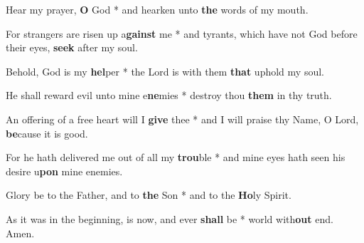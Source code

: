 \begin{multicols}{2}
	Hear my prayer, \textbf{O} God * and hearken unto \textbf{the} words of my mouth.
	
	For strangers are risen up a\textbf{gainst} me * and tyrants, which have not God before their eyes, \textbf{seek} after my soul.
	
	Behold, God is my \textbf{hel}per * the Lord is with them \textbf{that} uphold my soul.
	
	He shall reward evil unto mine e\textbf{ne}mies * destroy thou \textbf{them} in thy truth.
	
	An offering of a free heart will I \textbf{give} thee * and I will praise thy Name, O Lord, \textbf{be}cause it is good.
	
	For he hath delivered me out of all my \textbf{trou}ble * and mine eyes hath seen his desire u\textbf{pon} mine enemies.
	
	Glory be to the Father, and to \textbf{the} Son * and to the \textbf{Ho}ly Spirit.
	
	As it was in the beginning, is now, and ever \textbf{shall} be * world with\textbf{out} end. Amen.
\end{multicols}